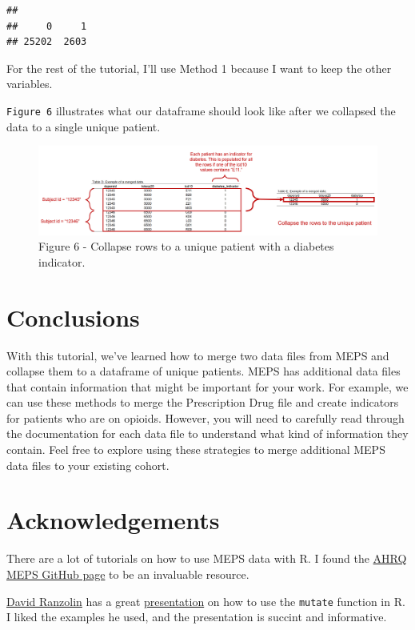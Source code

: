 \documentclass[
]{book}
\theoremstyle{definition}
\theoremstyle{definition}
\theoremstyle{definition}
\theoremstyle{definition}
\theoremstyle{remark}
\begin{document}
\begin{verbatim}
## 
##     0     1 
## 25202  2603
\end{verbatim}

For the rest of the tutorial, I'll use Method 1 because I want to keep the other variables.

\texttt{Figure\ 6} illustrates what our dataframe should look like after we collapsed the data to a single unique patient.

\begin{figure}
\includegraphics[width=1\linewidth]{Figure 2_6} \caption{Figure 6 - Collapse rows to a unique patient with a diabetes indicator.}\label{fig:unnamed-chunk-22}
\end{figure}

\hypertarget{conclusions-1}{%
\section{Conclusions}\label{conclusions-1}}

With this tutorial, we've learned how to merge two data files from MEPS and collapse them to a dataframe of unique patients. MEPS has additional data files that contain information that might be important for your work. For example, we can use these methods to merge the Prescription Drug file and create indicators for patients who are on opioids. However, you will need to carefully read through the documentation for each data file to understand what kind of information they contain. Feel free to explore using these strategies to merge additional MEPS data files to your existing cohort.

\hypertarget{acknowledgements-1}{%
\section{Acknowledgements}\label{acknowledgements-1}}

There are a lot of tutorials on how to use MEPS data with R. I found the \href{https://github.com/HHS-AHRQ/MEPS}{AHRQ MEPS GitHub page} to be an invaluable resource.

\href{https://daranzolin.github.io/}{David Ranzolin} has a great \href{https://rstudio-pubs-static.s3.amazonaws.com/116317_e6922e81e72e4e3f83995485ce686c14.html\#/2}{presentation} on how to use the \texttt{mutate} function in R. I liked the examples he used, and the presentation is succint and informative.
\end{document}
